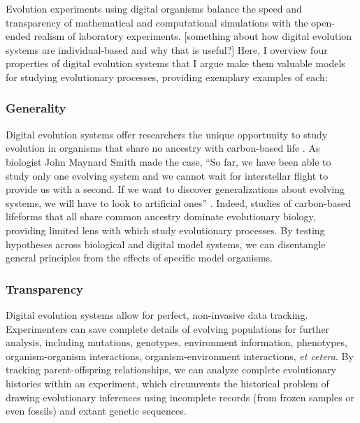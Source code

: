 Evolution experiments using digital organisms balance the speed and transparency of mathematical and computational simulations with the open-ended realism of laboratory experiments. 
[something about how digital evolution systems are individual-based and why that is useful?]
Here, I overview four properties of digital evolution systems that I argue make them valuable models for studying evolutionary processes, providing exemplary examples of each:

\subsubsection{Generality}

Digital evolution systems offer researchers the unique opportunity to study evolution in organisms that share no ancestry with carbon-based life \citep{wilke_biology_2002}.
As biologist John Maynard Smith made the case, ``So far, we have been able to study only one evolving system and we cannot wait for interstellar flight to provide us with a second. If we want to discover generalizations about evolving systems, we will have to look to artificial ones'' \citep{maynard_smith_byte-sized_1992}.
Indeed, studies of carbon-based lifeforms that all share common ancestry dominate evolutionary biology, providing limited lens with which study evolutionary processes.
By testing hypotheses across biological and digital model systems, we can disentangle general principles from the effects of specific model organisms.  



\subsubsection{Transparency}


Digital evolution systems allow for perfect, non-invasive data tracking.
Experimenters can save complete details of evolving populations for further analysis, including mutations, genotypes, environment information, phenotypes, organism-organism interactions, organism-environment interactions, \textit{et cetera}.
By tracking parent-offspring relationships, we can analyze complete evolutionary histories within an experiment, which circumvents the historical problem of drawing evolutionary inferences using incomplete records (from frozen samples or even fossils) and extant genetic sequences.


